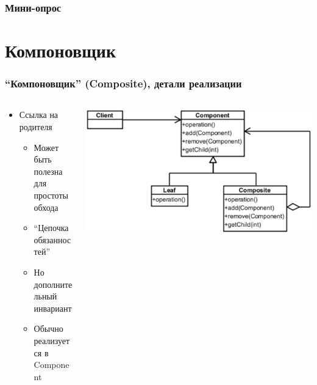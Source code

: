 \documentclass[xetex,mathserif,serif]{beamer}
\begin{document}
    \begin{frame}
        \frametitle{Мини-опрос}
    \end{frame}

    \section{Компоновщик}

    \begin{frame}
        \frametitle{``Компоновщик'' (Composite), детали реализации}
        \begin{columns}
            \begin{column}{0.6\textwidth}
                \begin{itemize}
                    \item Ссылка на родителя
                    \begin{itemize}
                        \item Может быть полезна для простоты обхода
                        \item ``Цепочка обязанностей''
                        \item Но дополнительный инвариант
                        \item Обычно реализуется в Component
                    \end{itemize}
                \end{itemize}
            \end{column}
            \begin{column}{0.4\textwidth}
                \begin{center}
                    \includegraphics[width=\textwidth]{composite.png}
                \end{center}
            \end{column}
        \end{columns}


\end{frame}
\end{document}
